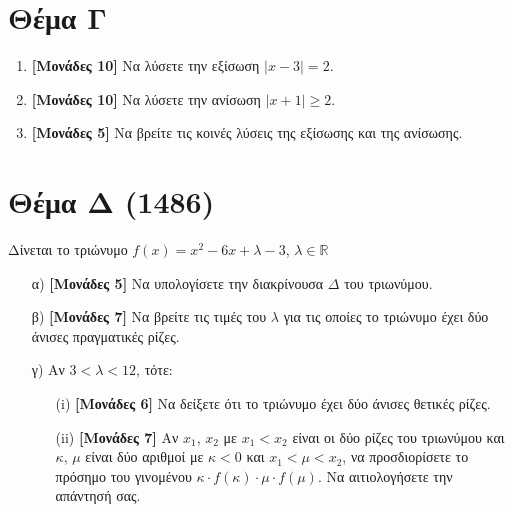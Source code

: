\documentclass[12pt]{article}
\begin{document}
\section*{Θέμα Γ}
  \noindent
  \begin{enumerate}
    \item \textbf{[Μονάδες 10]} Να λύσετε την εξίσωση $|x-3|=2$.
    \item \textbf{[Μονάδες 10]} Να λύσετε την ανίσωση $|x+1|\ge 2$.
    \item \textbf{[Μονάδες 5]} Να βρείτε τις κοινές λύσεις της εξίσωσης και της ανίσωσης.
  \end{enumerate}

\section*{Θέμα Δ (1486)}
  \noindent
  Δίνεται το τριώνυμο $f(x)=x^2-6x+λ-3$, $λ\in \mathbb{R}$
  \begin{enumerate}
    \item [α)] \textbf{[Μονάδες 5]} Να υπολογίσετε την διακρίνουσα $Δ$ του τριωνύμου.
    \item [β)] \textbf{[Μονάδες 7]} Να βρείτε τις τιμές του $λ$ για τις οποίες το τριώνυμο έχει δύο άνισες πραγματικές ρίζες.
    \item [γ)] Αν $3<λ<12$, τότε:
    \begin{enumerate}
      \item [(i)] \textbf{[Μονάδες 6]} Να δείξετε ότι το τριώνυμο έχει δύο άνισες θετικές ρίζες.
      \item [(ii)] \textbf{[Μονάδες 7]} Αν $x_1$, $x_2$ με $x_1<x_2$ είναι οι δύο ρίζες του τριωνύμου και $κ$, $μ$ είναι δύο αριθμοί με $κ<0$ και $x_1<μ<x_2$, να προσδιορίσετε το πρόσημο του γινομένου $κ\cdot f(κ)\cdot μ \cdot f(μ)$. Να αιτιολογήσετε την απάντησή σας.
    \end{enumerate}
  \end{enumerate}

\vspace{3\baselineskip}
\end{document}
